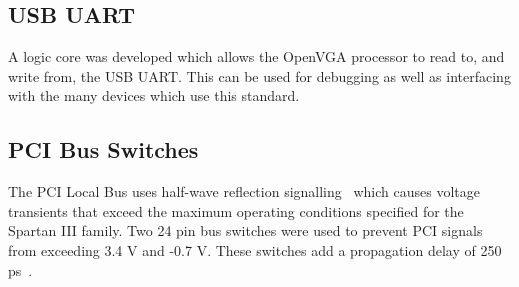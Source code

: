 \subsection{USB UART}
A logic core was developed which allows the OpenVGA processor to read to, and
write from, the USB UART. This can be used for debugging as well as interfacing
with the many devices which use this standard.


\subsection{PCI Bus Switches}
The PCI Local Bus uses half-wave reflection signalling~\cite{PCI_Spec, PCI_Book}
which causes voltage transients that exceed the maximum operating conditions
specified for the Spartan III family\cite{Xilinx_SP3_DS}. Two 24 pin bus switches
were used to prevent PCI signals from exceeding 3.4 V and -0.7 V. These switches
add a propagation delay of 250 ps~\cite{Bus_Switch_DS}.


